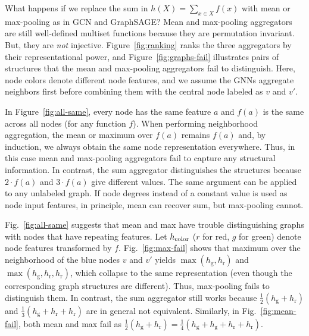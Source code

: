 What happens if we replace the sum in $h\left(X \right) =   \sum_{x \in X} f(x)$ with mean or max-pooling as in GCN and GraphSAGE? Mean and max-pooling aggregators are still well-defined multiset functions because they are permutation invariant. But, they are \textit{not} injective. Figure~\ref{fig:ranking} ranks the three aggregators by their representational power, and Figure~\ref{fig:graphs-fail} illustrates pairs of structures that the mean and max-pooling aggregators fail to distinguish. Here, node colors denote different node features, and we assume the GNNs aggregate neighbors first before combining them with the central node labeled as $v$ and $v'$.

In Figure~\ref{fig:all-same}, every node has the same feature $a$ and $f(a)$ is the same across all nodes (for any function $f$). When performing neighborhood aggregation, the mean or maximum over $f(a)$ remains $f(a)$ and, by induction, we always obtain the same node representation everywhere. Thus, in this case mean and max-pooling aggregators fail to capture any structural information. In contrast, the sum aggregator distinguishes the structures because $2 \cdot f(a)$ and $3 \cdot f(a)$ give different values. The same argument can be applied to any unlabeled graph. If node degrees instead of a constant value is used as node input features, in principle, mean can recover sum, but max-pooling cannot.

Fig.~\ref{fig:all-same} suggests that mean and max have trouble distinguishing graphs with nodes that have repeating features. Let $h_{{\rm color}}$ ($r$ for red, $g$ for green) denote node features transformed by $f$.
Fig.~\ref{fig:max-fail} shows that maximum over the neighborhood of the blue nodes $v$ and $v'$ yields $\max \left( h_{\text{g}}, h_{\text{r}} \right)$ and $\max \left( h_{\text{g}}, h_{\text{r}}, h_{\text{r}} \right)$, which collapse to the same representation (even though the corresponding graph structures are different). Thus, max-pooling fails to distinguish them. In contrast, the sum aggregator still works because $\frac{1}{2} \left( h_{\text{g}} + h_{\text{r}} \right)$ and $\frac{1}{3} \left( h_{\text{g}} + h_{\text{r}} + h_{\text{r}} \right)$ are in general not equivalent. Similarly, in Fig.~\ref{fig:mean-fail}, both mean and max fail as $\frac{1}{2} \left( h_{\text{g}} + h_{\text{r}} \right) = \frac{1}{4} \left( h_{\text{g}} +h_{\text{g}} + h_{\text{r}} + h_{\text{r}} \right)$. 



